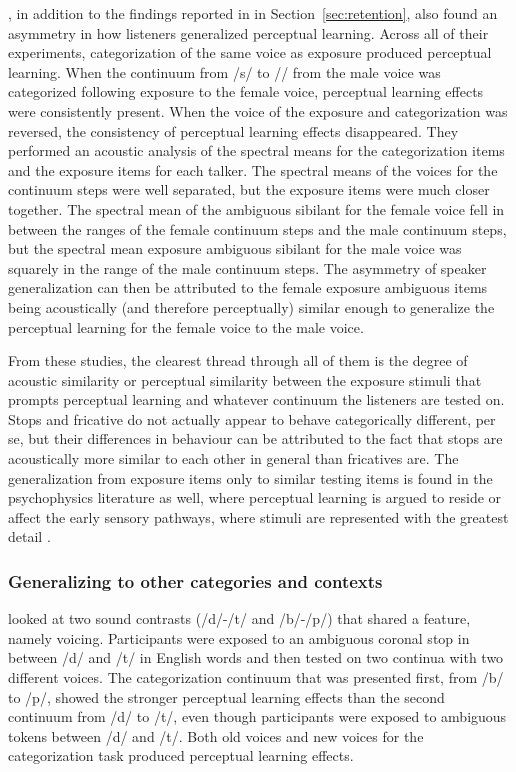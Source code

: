 \citet{Kraljic2005}, in addition to the findings reported in in Section~\ref{sec:retention}, also found an asymmetry in how listeners generalized perceptual learning.  
Across all of their experiments, categorization of the same voice as exposure produced perceptual learning.  
When the continuum from /s/ to /\textesh/ from the male voice was categorized following exposure to the female voice, perceptual learning effects were consistently present.
When the voice of the exposure and categorization was reversed, the consistency of perceptual learning effects disappeared. 
They performed an acoustic analysis of the spectral means for the categorization items and the exposure items for each talker.  
The spectral means of the voices for the continuum steps were well separated, but the exposure items were much closer together.  
The spectral mean of the ambiguous sibilant for the female voice fell in between the ranges of the female continuum steps and the male continuum steps, but the spectral mean exposure ambiguous sibilant for the male voice was squarely in the range of the male continuum steps.  
The asymmetry of speaker generalization can then be attributed to the female exposure ambiguous items being acoustically (and therefore perceptually) similar enough to generalize the perceptual learning for the female voice to the male voice.

From these studies, the clearest thread through all of them is the degree of acoustic similarity or perceptual similarity between the exposure stimuli that prompts perceptual learning and whatever continuum the listeners are tested on.  
Stops and fricative do not actually appear to behave categorically different, per se, but their differences in behaviour can be attributed to the fact that stops are acoustically more similar to each other in general than fricatives are.
The generalization from exposure items only to similar testing items is found in the psychophysics literature as well, where perceptual learning is argued to reside or affect the early sensory pathways, where stimuli are represented with the greatest detail \citep{Gilbert2001}.


\subsubsection{Generalizing to other categories and contexts}
\label{sec:othergeneralization}

\citet{Kraljic2006} looked at two sound contrasts (/d/-/t/ and /b/-/p/) that shared a feature, namely voicing.  
Participants were exposed to an ambiguous coronal stop in between /d/ and /t/ in English words and then tested on two continua with two different voices.  
The categorization continuum that was presented first, from /b/ to /p/, showed the stronger perceptual learning effects than the second continuum from /d/ to /t/, even though participants were exposed to ambiguous tokens between /d/ and /t/. 
 Both old voices and new voices for the categorization task produced perceptual learning effects.

